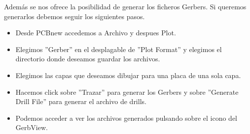 		Además se nos ofrece la posibilidad de generar los ficheros Gerbers. Si queremos generarlos debemos seguir los siguientes pasos.
		
		\begin{itemize}	
			
			\item Desde PCBnew accedemos a Archivo y despues Plot.
			
			\item Elegimos ''Gerber'' en el desplagable de ''Plot Format'' y elegimos el directorio donde deseamos guardar los archivos.
			
			\item Elegimos las capas que deseamos dibujar para una placa de una sola capa.
			
			\item Hacemos click sobre ''Trazar'' para generar los Gerbers y sobre ''Generate Drill File'' para generar el archivo de drills.
			
			\item Podemos acceder a ver los archivos generados pulsando sobre el icono del GerbView.
			
		\end{itemize}

	
	\newpage
	$\ $